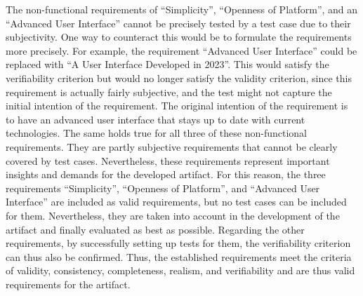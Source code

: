 The non-functional requirements of \enquote{Simplicity}, \enquote{Openness of Platform}, and an \enquote{Advanced User Interface} cannot be precisely tested by a test case due to their subjectivity. One way to counteract this would be to formulate the requirements more precisely. For example, the requirement \enquote{Advanced User Interface} could be replaced with \enquote{A User Interface Developed in 2023}. This would satisfy the verifiability criterion but would no longer satisfy the validity criterion, since this requirement is actually fairly subjective, and the test might not capture the initial intention of the requirement. The original intention of the requirement is to have an advanced user interface that stays up to date with current technologies. The same holds true for all three of these non-functional requirements. They are partly subjective requirements that cannot be clearly covered by test cases. Nevertheless, these requirements represent important insights and demands for the developed artifact. For this reason, the three requirements \enquote{Simplicity}, \enquote{Openness of Platform}, and \enquote{Advanced User Interface} are included as valid requirements, but no test cases can be included for them. Nevertheless, they are taken into account in the development of the artifact and finally evaluated as best as possible. Regarding the other requirements, by successfully setting up tests for them, the verifiability criterion can thus also be confirmed. Thus, the established requirements meet the criteria of validity, consistency, completeness, realism, and verifiability and are thus valid requirements for the artifact.

